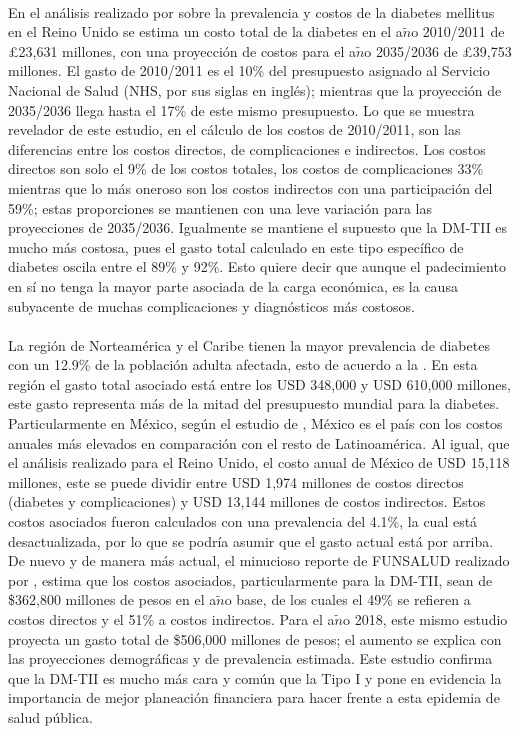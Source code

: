 \\
En el an\'alisis realizado por \cite{hex2012estimating} sobre la prevalencia y costos de la diabetes mellitus en el Reino Unido se estima un costo total de la diabetes en el a$\tilde{n}$o 2010/2011 de \pounds 23,631 millones, con una proyecci\'on de costos para el a$\tilde{n}$o 2035/2036 de \pounds 39,753 millones. El gasto de 2010/2011 es el 10\% del presupuesto asignado al Servicio Nacional de Salud (NHS, por sus siglas en ingl\'es); mientras que la proyecci\'on de 2035/2036 llega hasta el 17\% de este mismo presupuesto. Lo que se muestra revelador de este estudio, en el c\'alculo de los costos de 2010/2011, son las diferencias entre los costos directos, de complicaciones e indirectos. Los costos directos son solo el 9\% de los costos totales, los costos de complicaciones 33\% mientras que lo m\'as oneroso son los costos indirectos con una participaci\'on del 59\%; estas proporciones se mantienen con una leve variaci\'on para las proyecciones de 2035/2036. Igualmente se mantiene el supuesto que la DM-TII es mucho m\'as costosa, pues el gasto total calculado en este tipo espec\'ifico de diabetes oscila entre el 89\% y 92\%. Esto quiere decir que aunque el padecimiento en sí no tenga la mayor parte asociada de la carga econ\'omica, es la causa subyacente de muchas complicaciones y diagn\'osticos m\'as costosos.\\
\\
La regi\'on de Norteam\'erica y el Caribe tienen la mayor prevalencia de diabetes con un 12.9\% de la poblaci\'on adulta afectada, esto de acuerdo a la \cite{atlas2015international}. En esta regi\'on el gasto total asociado est\'a entre los USD 348,000 y USD 610,000 millones, este gasto representa m\'as de la mitad del presupuesto mundial para la diabetes. Particularmente en M\'exico, seg\'un el estudio de \cite{barcelo2003cost}, M\'exico es el pa\'is con los costos anuales m\'as elevados en comparaci\'on con el resto de Latinoam\'erica. Al igual, que el an\'alisis realizado para el Reino Unido, el costo anual de M\'exico de USD 15,118 millones, este se puede dividir entre USD 1,974 millones de costos directos (diabetes y complicaciones) y USD 13,144 millones de costos indirectos. Estos costos asociados fueron calculados con una prevalencia del 4.1\%, la cual est\'a desactualizada, por lo que se podr\'ia asumir que el gasto actual est\'a por arriba. De nuevo y de manera m\'as actual, el minucioso reporte de FUNSALUD realizado por \cite{barraza2015carga}, estima que los costos asociados, particularmente para la DM-TII, sean de \$362,800 millones de pesos en el a$\tilde{n}$o base, de los cuales el 49\% se refieren a costos directos y el 51\% a costos indirectos. Para el a$\tilde{n}$o 2018, este mismo estudio proyecta un gasto total de \$506,000 millones de pesos; el aumento se explica con las proyecciones demogr\'aficas y de prevalencia estimada. Este estudio confirma que la DM-TII es mucho m\'as cara y com\'un que la Tipo I y pone en evidencia la importancia de mejor planeaci\'on financiera para hacer frente a esta epidemia de salud p\'ublica.\\
